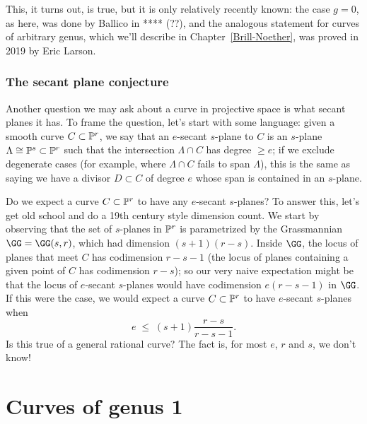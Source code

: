 This, it turns out, is true, but it is only relatively recently known: the case $g=0$, as here, was done by Ballico in **** (??), and the analogous statement for curves of arbitrary genus, which we'll describe in Chapter~\ref{Brill-Noether}, was proved in 2019 by Eric Larson.

\subsubsection{The secant plane conjecture}

Another question we may ask about a curve in projective space is what secant planes it has. To frame the question, let's start with some language: given a smooth curve $C \subset \PP^r$, we say that an $e$-secant $s$-plane to $C$ is an $s$-plane $\Lambda \cong \PP^s \subset \PP^r$ such that the intersection $\Lambda \cap C$ has degree $\geq e$; if we exclude degenerate cases (for example, where $\Lambda \cap C$ fails to span $\Lambda$), this is the same as saying we have a divisor $D \subset C$ of degree $e$ whose span is contained in an $s$-plane.

Do we expect a curve $C \subset \PP^r$ to have any $e$-secant $s$-planes? To answer this, let's get old school and do a 19th century style dimension count. We start by observing that the set of $s$-planes in $\PP^r$ is parametrized by the Grassmannian $\GG = \GG(s,r)$, which had dimension $(s+1)(r-s)$. Inside $\GG$, the locus of planes that meet $C$ has codimension $r-s-1$ (the locus of planes containing a given point of $C$ has codimension $r-s$); so our very naive expectation might be that the locus of $e$-secant $s$-planes would have codimension $e(r-s-1)$ in $\GG$. If this were the case, we would expect a curve $C \subset \PP^r$ to have $e$-secant $s$-planes when 
$$
e \; \leq \; (s+1)\frac{r-s}{r-s-1}.
$$
Is this true of a general rational curve? The fact is, for most $e$, $r$ and $s$, we don't know!

\section{Curves of genus 1}


